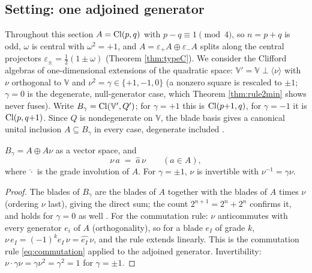 \subsection{Setting: one adjoined generator}\label{subsec:rule2setting}

Throughout this section $A = \mathrm{Cl}(p,q)$ with $p - q \equiv 1 \pmod 4$, so $n = p + q$ is odd, $\omega$ is central with $\omega^2 = +1$, and $A = \varepsilon_+ A \oplus \varepsilon_- A$ splits along the central projectors $\varepsilon_\pm = \tfrac12(1 \pm \omega)$ (Theorem \ref{thm:typeC}). We consider the Clifford algebras of one-dimensional extensions of the quadratic space: $\mathbb{V}' = \mathbb{V} \perp \langle \nu \rangle$ with $\nu$ orthogonal to $\mathbb{V}$ and $\nu^2 = \gamma \in \{+1, -1, 0\}$ (a nonzero square is rescaled to $\pm 1$; $\gamma = 0$ is the degenerate, null-generator case, which Theorem \ref{thm:rule2min} shows never fuses). Write $B_\gamma = \mathrm{Cl}(\mathbb{V}', Q')$; for $\gamma = +1$ this is $\mathrm{Cl}(p{+}1, q)$, for $\gamma = -1$ it is $\mathrm{Cl}(p, q{+}1)$. Since $Q$ is nondegenerate on $\mathbb{V}$, the blade basis gives a canonical unital inclusion $A \subseteq B_\gamma$ in every case, degenerate included \cite{Chevalley1997}.

\begin{lemma}\label{lem:BAdecomp}
$B_\gamma = A \oplus A\nu$ as a vector space, and
\[
\nu\, a \;=\; \hat{a}\, \nu \qquad (a \in A),
\]
where $\hat{\cdot}$ is the grade involution of $A$. For $\gamma = \pm 1$, $\nu$ is invertible with $\nu^{-1} = \gamma\nu$.
\end{lemma}

\begin{proof}
The blades of $B_\gamma$ are the blades of $A$ together with the blades of $A$ times $\nu$ (ordering $\nu$ last), giving the direct sum; the count $2^{n+1} = 2^n + 2^n$ confirms it, and holds for $\gamma = 0$ as well \cite{Chevalley1997}. For the commutation rule: $\nu$ anticommutes with every generator $e_i$ of $A$ (orthogonality), so for a blade $e_I$ of grade $k$, $\nu\, e_I = (-1)^k e_I\, \nu = \hat{e_I}\,\nu$, and the rule extends linearly. This is the commutation rule \eqref{eq:commutation} applied to the adjoined generator. Invertibility: $\nu \cdot \gamma\nu = \gamma \nu^2 = \gamma^2 = 1$ for $\gamma = \pm 1$.
\end{proof}

